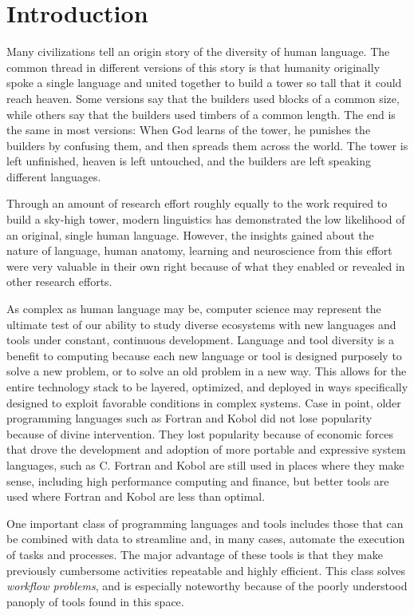 \chapter{Introduction} \label{ch:introduction}

Many civilizations tell an origin story of the diversity of human language. The
common thread in different versions of this story is that humanity
originally spoke a single language and united together to build a tower so tall
that it could reach heaven. Some versions say that the builders used blocks of
a common size, while others say that the builders used timbers of a common
length. The end is the same in most versions: When God learns of the
tower, he punishes the builders by confusing them, and then spreads them across
the world. The tower is left unfinished, heaven is left untouched, and the
builders are left speaking different languages.

Through an amount of research effort roughly equally to the work required
to build a sky-high tower, modern linguistics has demonstrated the low
likelihood of an original, single human language. However, the insights gained
about the nature of language, human anatomy, learning and neuroscience from this
effort were very valuable in their own right because of what they enabled or
revealed in other research efforts.

As complex as human language may be, computer science may represent the ultimate
test of our ability to study diverse ecosystems with new languages and tools
under constant, continuous development. Language and tool diversity is a
benefit to computing because each new language or tool is designed purposely to
solve a new problem, or to solve an old problem in a new way. This allows for
the entire technology stack to  be layered, optimized, and deployed in ways
specifically designed to exploit favorable conditions in complex systems. Case
in point, older programming languages such as Fortran and Kobol did not lose
popularity because of divine intervention. They lost popularity because of
economic forces that drove the development and adoption of more portable and
expressive system languages, such as C. Fortran and Kobol are still used in
places where they make sense, including high performance computing and finance,
but better tools are used where Fortran and Kobol are less than optimal.

One important class of programming languages and tools includes those that
can be combined with data to streamline and, in many cases, automate the
execution of tasks and processes. The major advantage of these tools is that
they make previously cumbersome activities repeatable and highly efficient.
This class solves \textit{workflow problems}, and is especially noteworthy
because of the poorly understood panoply of tools found in this space.


